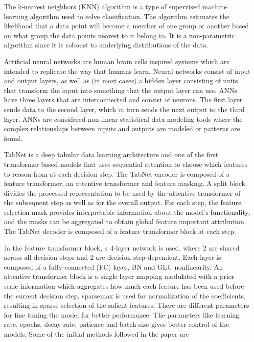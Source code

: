 \documentclass[conference,final,]{IEEEtran}
\begin{document}
The k-nearest neighbors (KNN) algorithm is a type of supervised machine
learning algorithm used to solve classification. The algorithm estimates
the likelihood that a data point will become a member of one group or
another based on what group the data points nearest to it belong to. It
is a non-parametric algorithm since it is roboust to underlying
distributions of the data.

Artificial neural networks are human brain cells inspired systems which
are intended to replicate the way that humans learn. Neural networks
consist of input and output layers, as well as (in most cases) a hidden
layer consisting of units that transform the input into something that
the output layer can use. ANNs have three layers that are interconnected
and consist of neurons. The first layer sends data to the second layer,
which in turn sends the next output to the third layer. ANNs are
considered non-linear statistical data modeling tools where the complex
relationships between inputs and outputs are modeled or patterns are
found.

TabNet is a deep tabular data learning architecture and one of the first
transformer based models that uses sequential attention to choose which
features to reason from at each decision step. The TabNet encoder is
composed of a feature transformer, an attentive transformer and feature
masking. A split block divides the processed representation to be used
by the attentive transformer of the subsequent step as well as for the
overall output. For each step, the feature selection mask provides
interpretable information about the model's functionality, and the masks
can be aggregated to obtain global feature important attribution. The
TabNet decoder is composed of a feature transformer block at each step.

In the feature transformer block, a 4-layer network is used, where 2 are
shared across all decision steps and 2 are decision step-dependent. Each
layer is composed of a fully-connected (FC) layer, BN and GLU
nonlinearity. An attentive transformer block is a single layer mapping
modulated with a prior scale information which aggregates how much each
feature has been used before the current decision step. sparsemax is
used for normalization of the coefficients, resulting in sparse
selection of the salient features. There are different parameters for
fine tuning the model for better performance. The parameters like
learning rate, epochs, decay rate, patience and batch size gives better
control of the models. Some of the initial methods followed in the paper
are
\end{document}
